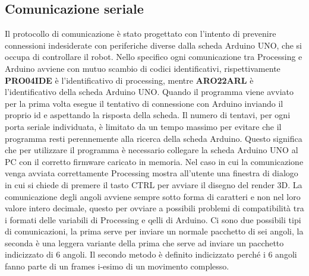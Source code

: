 \documentclass[a4paper]{article}
\begin{document}
    \subsection{Comunicazione seriale}
    
    \begin{text}
        Il protocollo di comunicazione è stato progettato con l'intento di prevenire connessioni indesiderate con periferiche diverse dalla scheda Arduino UNO, che si occupa di controllare il robot. Nello specifico ogni comunicazione tra Processing e Arduino avviene con mutuo scambio di codici identificativi, rispettivamente \textbf{PRO04IDE} è l'identificativo di processing, mentre \textbf{ARO22ARL} è l'identificativo della scheda Arduino UNO. Quando il programma viene avviato per la prima volta esegue il tentativo di connessione con Arduino inviando il proprio id e aspettando la risposta della scheda. Il numero di tentavi, per ogni porta seriale individuata, è limitato da un tempo massimo per evitare che il programma resti perennemente alla ricerca della scheda Arduino. Questo significa che per utilizzare il programma è necessario collegare la scheda Arduino UNO al PC con il corretto firmware caricato in memoria. Nel caso in cui la comunicazione venga avviata correttamente Processing mostra all'utente una finestra di dialogo in cui si chiede di premere il tasto CTRL per avviare il disegno del render 3D. La comunicazione degli angoli avviene sempre sotto forma di caratteri e non nel loro valore intero decimale, questo per ovviare a possibili problemi di compatibilità tra i formati delle variabili di Processing e qelli di Arduino. Ci sono due possibili tipi di comunicazioni, la prima serve per inviare un normale pacchetto di sei angoli, la seconda è una leggera variante della prima che serve ad inviare un pacchetto indicizzato di 6 angoli. Il secondo metodo è definito indicizzato perché i 6 angoli fanno parte di un frames i-esimo di un movimento complesso. \\ \\
    \end{text}
    
\end{document}
